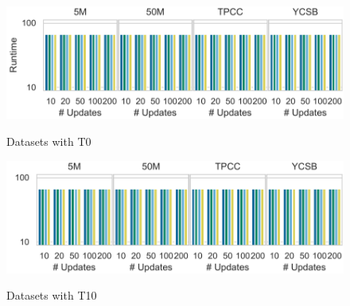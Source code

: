 \begin{figure}[t]
\begin{minipage}[b]{0.48\linewidth}
    \includegraphics[width=1\linewidth,trim=0 0 0 0, clip]{imgs/felix_t0_optimizations.pdf}\\
    \vspace{-8mm}
  \caption{Datasets with T0}
  \label{fig:Relation Size}
  \end{minipage}
 \begin{minipage}[b]{0.48\linewidth}
    \includegraphics[width=1\linewidth,trim=0 0 0 0, clip]{imgs/felix_t10_optimizations.pdf}\\
    \vspace{-8mm}
  \caption{Datasets with T10}
  \label{fig:Relation Size1}
  \end{minipage}
\end{figure}
